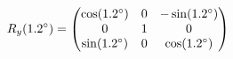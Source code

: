 \documentclass[preview]{standalone}
\begin{document}
\begin{align*}
\special{dvisvgm:raw <g id='unique000'>}R_y(1.2^\circ) = \begin{pmatrix} \cos(1.2^\circ) & 0 & -\sin(1.2^\circ) \\ 0 & 1 & 0 \\ \sin(1.2^\circ) & 0 & \cos(1.2^\circ) \end{pmatrix}\special{dvisvgm:raw </g>}
\end{align*}
\end{document}
